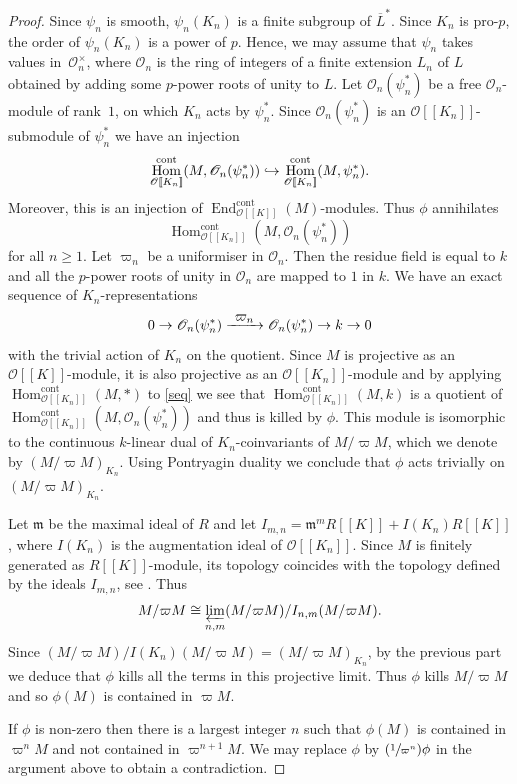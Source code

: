 \documentclass[JEP,XML,SOM,Unicode,NoEqCountersInSection]{cedram}
\let\mathcal\mathscr
\newcommand{\To}[1]{\mathchoice{\xrightarrow{\textstyle\kern4pt#1\kern3pt}}{\stackrel{#1}{\longrightarrow}}{}{}}
\newcommand\hto{\mathrel{\lhook\joinrel\to}}
\newcommand{\Psfrac}[2]{(\sfrac{#1}{#2})}
\theoremstyle{definition}
\DeclareMathOperator{\End}{End}
\DeclareMathOperator{\Hom}{Hom}
\newcommand{\br}[1]{[\![#1]\!]}
\newcommand{\mm}{\mathfrak m}
\newcommand{\cO}{\mathcal{O}}
\newcommand{\cont}{\mathrm{cont}}
\begin{document}
\begin{proof} Since $\psi_n$ is smooth, $\psi_n(K_n)$ is a finite subgroup of $\overline{L}^*$. Since $K_n$ is pro-$p$, the order of $\psi_n(K_n)$ is a power of $p$. Hence, we may assume that $\psi_n$ takes values in~$\cO_n^{\times}$, where $\cO_n$ is
the ring of integers of a finite extension $L_n$ of $L$ obtained by adding some $p$-power roots of unity to $L$. Let $\cO_n(\psi_n^*)$ be a free $\cO_n$-module of rank~$1$, on which $K_n$ acts by $\psi_n^*$. Since $\cO_n(\psi_n^*)$ is an $\cO\br{K_n}$-submodule of $\psi_n^*$ we have an injection
\[
\Hom_{\cO\br{K_n}}^{\cont}(M, \cO_n(\psi_n^*))\hto
\Hom_{\cO\br{K_n}}^{\cont}(M, \psi_n^*).
\]
Moreover, this is an injection of $\End_{\cO\br{K}}^{\cont}(M)$-modules. Thus $\phi$ annihilates
\[
\Hom_{\cO\br{K_n}}^{\cont}(M, \cO_n(\psi_n^*))
\]
for all $n\ge 1$. Let $\varpi_n$ be a uniformiser in $\cO_n$. Then the residue field is equal to $k$ and all the $p$-power roots of unity in $\cO_n$ are mapped to $1$ in $k$. We have an exact sequence of $K_n$-representations
\begin{equation}\label{seq}
0\to \cO_n(\psi_n^*)\To{\varpi_n}\cO_n(\psi_n^*)\to k\to 0
\end{equation}
with the trivial action of $K_n$ on the quotient. Since $M$ is projective as an $\cO\br{K}$-module,
it is also projective as an $\cO\br{K_n}$-module and
by applying $\Hom^{\cont}_{\cO\br{K_n}}(M, \ast)$ to \eqref{seq} we see that
$\Hom^{\cont}_{\cO\br{K_n}}(M, k)$ is a quotient of $\Hom_{\cO\br{K_n}}^{\cont}(M, \cO_n(\psi_n^*))$ and thus is killed by $\phi$. This module is isomorphic to the continuous $k$-linear dual of $K_n$-coinvariants
of $M/\varpi M$, which we denote by $(M/\varpi M)_{K_n}$. Using Pontryagin duality we conclude that $\phi$ acts trivially on $(M/\varpi M)_{K_n}$.

Let $\mm$ be the maximal ideal of $R$ and let $I_{m,n}= \mm^m R\br{K} + I(K_n)R\br{K}$, where $I(K_n)$ is
the augmentation ideal of $\cO\br{K_n}$. Since $M$ is finitely generated as $R\br{K}$\nobreakdash-mod\-ule, its topology coincides with the topology defined by the ideals $I_{m,n}$, see \cite[(5.2.17)]{nsw2}. Thus
\[
M/\varpi M \cong \varprojlim_{n, m} (M/\varpi M)/ I_{n,m} (M/\varpi M). 
\]
Since $(M/\varpi M)/ I(K_n) ( M/\varpi M)= (M/\varpi M)_{K_n}$, by the previous part we deduce that $\phi$ kills all the terms in this projective limit. Thus $\phi$ kills $M/\varpi M$ and so $\phi(M)$ is contained in $\varpi M$.

If $\phi$ is non-zero then there is a largest integer $n$ such that $\phi(M)$ is contained in $\varpi^n M$ and
not contained in
$\varpi^{n+1} M$. We may replace $\phi$ by $\Psfrac{1}{\varpi^n}\phi $ in the argument above to obtain a contradiction.
\end{proof}
\end{document}
